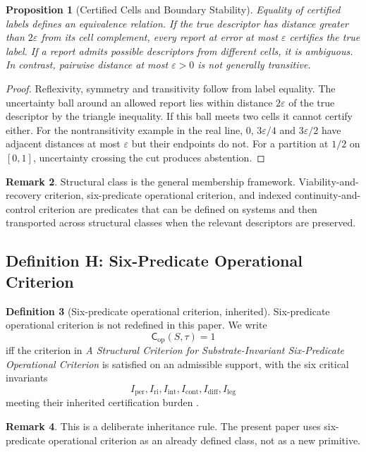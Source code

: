\documentclass[11pt,a4paper]{article}
\newtheorem{proposition}{Proposition}[section]
\theoremstyle{definition}
\newtheorem{definition}[proposition]{Definition}
\newtheorem{remark}[proposition]{Remark}
\newcommand{\Cop}{\mathsf{C}_{\mathrm{op}}}
\newcommand{\eps}{\varepsilon}
\newcommand{\Iper}{I_{\mathrm{per}}}
\newcommand{\Iri}{I_{\mathrm{ri}}}
\newcommand{\Iint}{I_{\mathrm{int}}}
\newcommand{\Icont}{I_{\mathrm{cont}}}
\newcommand{\Idiff}{I_{\mathrm{diff}}}
\newcommand{\Ileg}{I_{\mathrm{leg}}}
\begin{document}
\begin{proposition}[Certified Cells and Boundary Stability]\label{prop:certified-descriptor-cells}
Equality of certified labels defines an equivalence relation. If the true descriptor has distance greater than $2\eps$ from its cell complement, every report at error at most $\eps$ certifies the true label. If a report admits possible descriptors from different cells, it is ambiguous. In contrast, pairwise distance at most $\eps>0$ is not generally transitive.
\end{proposition}
\begin{proof}
Reflexivity, symmetry and transitivity follow from label equality. The uncertainty ball around an allowed report lies within distance $2\eps$ of the true descriptor by the triangle inequality. If this ball meets two cells it cannot certify either. For the nontransitivity example in the real line, $0$, $3\eps/4$ and $3\eps/2$ have adjacent distances at most $\eps$ but their endpoints do not. For a partition at $1/2$ on $[0,1]$, uncertainty crossing the cut produces abstention.
\end{proof}

\begin{remark}
Structural class is the general membership framework. Viability-and-recovery criterion, six-predicate operational criterion, and indexed continuity-and-control criterion are predicates that can be defined on systems and then transported across structural classes when the relevant descriptors are preserved.
\end{remark}

\subsection{Definition H: Six-Predicate Operational Criterion}
\begin{definition}[Six-predicate operational criterion, inherited]\label{def:cop}
Six-predicate operational criterion is not redefined in this paper. We write
\[
\Cop(S,\tau)=1
\]
iff the criterion in \textit{A Structural Criterion for Substrate-Invariant Six-Predicate Operational Criterion} is satisfied on an admissible support, with the six critical invariants
\[
\Iper,\Iri,\Iint,\Icont,\Idiff,\Ileg
\]
meeting their inherited certification burden \cite{paper5}.
\end{definition}

\begin{remark}
This is a deliberate inheritance rule. The present paper uses six-predicate operational criterion as an already defined class, not as a new primitive.
\end{remark}
\end{document}
